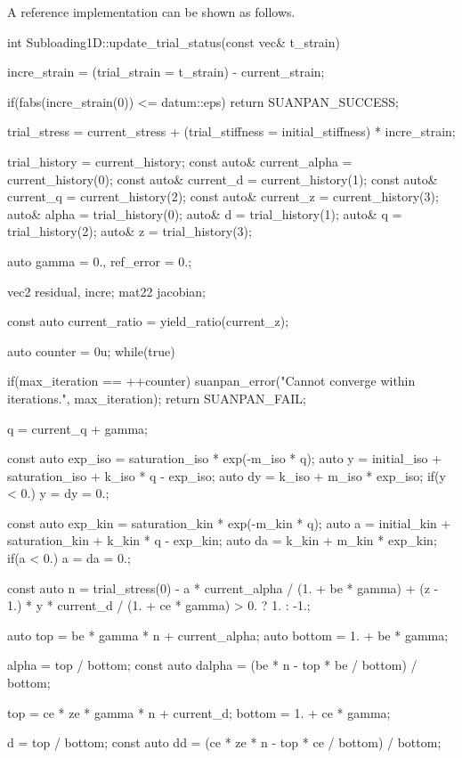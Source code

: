 A reference implementation can be shown as follows.
\begin{cppcode}
int Subloading1D::update_trial_status(const vec& t_strain) {
    incre_strain = (trial_strain = t_strain) - current_strain;

    if(fabs(incre_strain(0)) <= datum::eps) return SUANPAN_SUCCESS;

    trial_stress = current_stress + (trial_stiffness = initial_stiffness) * incre_strain;

    trial_history = current_history;
    const auto& current_alpha = current_history(0);
    const auto& current_d = current_history(1);
    const auto& current_q = current_history(2);
    const auto& current_z = current_history(3);
    auto& alpha = trial_history(0);
    auto& d = trial_history(1);
    auto& q = trial_history(2);
    auto& z = trial_history(3);

    auto gamma = 0., ref_error = 0.;

    vec2 residual, incre;
    mat22 jacobian;

    const auto current_ratio = yield_ratio(current_z);

    auto counter = 0u;
    while(true) {
        if(max_iteration == ++counter) {
            suanpan_error("Cannot converge within {} iterations.\n", max_iteration);
            return SUANPAN_FAIL;
        }

        q = current_q + gamma;

        const auto exp_iso = saturation_iso * exp(-m_iso * q);
        auto y = initial_iso + saturation_iso + k_iso * q - exp_iso;
        auto dy = k_iso + m_iso * exp_iso;
        if(y < 0.) y = dy = 0.;

        const auto exp_kin = saturation_kin * exp(-m_kin * q);
        auto a = initial_kin + saturation_kin + k_kin * q - exp_kin;
        auto da = k_kin + m_kin * exp_kin;
        if(a < 0.) a = da = 0.;

        const auto n = trial_stress(0) - a * current_alpha / (1. + be * gamma) + (z - 1.) * y * current_d / (1. + ce * gamma) > 0. ? 1. : -1.;

        auto top = be * gamma * n + current_alpha;
        auto bottom = 1. + be * gamma;

        alpha = top / bottom;
        const auto dalpha = (be * n - top * be / bottom) / bottom;

        top = ce * ze * gamma * n + current_d;
        bottom = 1. + ce * gamma;

        d = top / bottom;
        const auto dd = (ce * ze * n - top * ce / bottom) / bottom;

}}
\end{cppcode}
